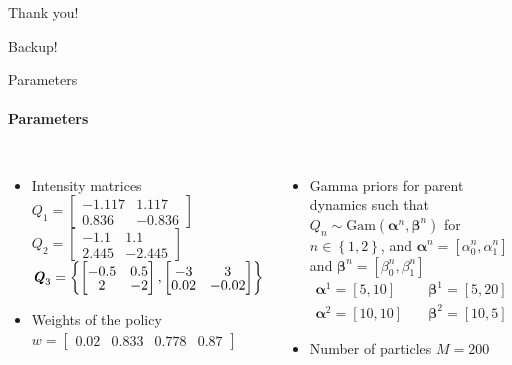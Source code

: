 \documentclass[
	english,%
	aspectratio=169,%
	color={accentcolor=3b},
	logo=true,%
	colorframetitle=false,%
	]{tudabeamer}
\begin{document}
\begin{frame}[c]{}
\centering \Huge
Thank you!
\end{frame}


\begin{frame}[c]{}
	\centering \Huge
	Backup!
\end{frame}

\begin{frame}{Parameters}
\framesubtitle{Parameters}
\begin{columns}[T]
	\begin{itemize}
		\item Intensity matrices \vspace{+4pt}\\
		$ Q_1 = 
		\begin{bmatrix}
		-1.117 & 1.117 \\
		0.836 &  -0.836
		\end{bmatrix} $\\
		\vspace{+3pt}
		$ Q_2 = 
		\begin{bmatrix}
			-1.1 & 1.1 \\
			2.445 &  -2.445
		\end{bmatrix}$\\
		\vspace{+3pt}
		$\textbf{\textit{Q}}_{3} = \left\lbrace 
		\begin{bmatrix}\vspace{-2pt}
		-0.5 & 0.5 \\\vspace{-2pt}
		2 &  -2
		\end{bmatrix}, 
		\begin{bmatrix}\vspace{-2pt}
		-3 & 3 \\\vspace{-2pt}
		0.02 &  -0.02
		\end{bmatrix} 
		\right\rbrace $
		\item Weights of the policy \vspace{+4pt} \\ $  w = \begin{bmatrix}0.02 & 0.833& 0.778& 0.87 \end{bmatrix}$
	\end{itemize}
	\begin{itemize}
		\item Gamma priors for parent dynamics such that $ Q_{n} \sim \mathrm{Gam}(\boldsymbol{\alpha}^n, \boldsymbol{\beta}^n)$ for $n \in \left\lbrace 1,2\right\rbrace $, and $ \boldsymbol{\alpha}^n = [\alpha^n_0, \alpha^n_1] $ and $ \boldsymbol{\beta}^n = [\beta^n_0, \beta^n_1] $
		\begin{align}
		\boldsymbol{\alpha}^1 = [5,10] &\quad \boldsymbol{\beta}^1 = [5,20] \nonumber\\
		\boldsymbol{\alpha}^2 = [10,10] &\quad \boldsymbol{\beta}^2 = [10,5] \nonumber
		\end{align}
		\item Number of particles $ M = 200 $
	\end{itemize}
\end{columns}
\end{frame}
\end{document}
